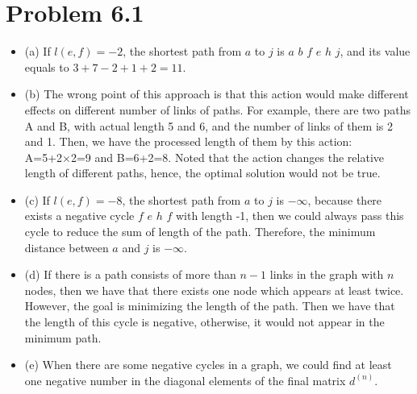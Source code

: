 \documentclass{article}
\theoremstyle{definition}
\theoremstyle{definition}
\theoremstyle{remark}
\begin{document}
\section*{Problem 6.1}
\begin{itemize}
	\item (a) If $l(e,f)=-2$, the shortest path from $a$ to $j$ is 
	$a$ \textrightarrow $b$ \textrightarrow $f$ \textrightarrow 
	$e$ \textrightarrow $h$ \textrightarrow $j$, 
	and its value equals to $3+7-2+1+2=11$.
	\item (b) The wrong point of this approach is that this action would 
	make different effects on different number of links of paths. 
	For example, there are two paths A and B, with actual length 5 and 6, 
	and the number of links of them is 2 and 1. Then, we have the processed 
	length of them by this action: A=5+2×2=9 and B=6+2=8. Noted that the 
	action changes the relative length of different paths, hence, the optimal
	solution would not be true.
	
	\item (c) If $l(e,f)=-8$, the shortest path from $a$ to $j$ is $-\infty$, 
	because there exists a negative cycle $f$ \textrightarrow 
	$e$ \textrightarrow $h$ \textrightarrow $f$ with length -1, 
	then we could always pass this cycle to reduce the sum of length of 
	the path. Therefore, the minimum distance between $a$ and $j$ is $-\infty$.
	
	\item (d) If there is a path consists of more than $n-1$ links in the 
	graph with $n$ nodes, then we have that there exists one node which appears 
	at least twice.  However, the goal is minimizing 
	the length of the path. Then we have that the length of this cycle is 
	negative, otherwise, it would not appear in the minimum path. 
	
	\item (e) When there are some negative cycles in a graph, we could find at 
	least one negative number in the diagonal elements of the final 
	matrix $d^(n)$.
	

\end{itemize}
\end{document}
